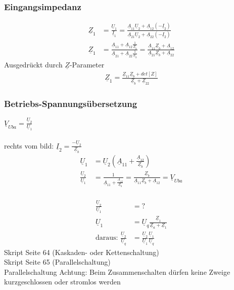 \subsubsection{Eingangsimpedanz}
\begin{align}
	\underline{Z}_1&=\frac{\underline{U}_1}{\underline{I}_1}=\frac{\underline{A}_{11}\underline{U}_{2}+\underline{A}_{12}\left(-\underline{I}_2\right)}{\underline{A}_{21}\underline{U}_2+\underline{A}_{22}\left(-\underline{I}_2\right)}\nonumber\\
	\underline{Z}_1&=\frac{\underline{A}_{11}+\underline{A}_{12}\frac{1}{\underline{Z}_b}}{\underline{A}_{21}+\underline{A}_{22}\frac{1}{\underline{Z}_b}}=\frac{\underline{A}_{11}\underline{Z}_b+\underline{A}_{12}}{\underline{A}_{21}\underline{Z}_b+\underline{A}_{22}}\nonumber
\end{align}
Ausgedrückt durch $\underline{Z}$-Parameter
\begin{align}
	\underline{Z}_1=\frac{\underline{Z}_{11}\underline{Z}_b+det[Z]}{\underline{Z}_b+\underline{Z}_{22}}\nonumber
\end{align}
\subsubsection{Betriebs-Spannungsübersetzung}
$\underline{V}_{Uba}=\frac{\underline{U}_{2}}{\underline{U}_{1}}$\\
\\
rechts vom bild:
$\underline{I}_{2}=\frac{-\underline{U}_{2}}{\underline{Z}_{b}}$\\
\begin{align}
	\underline{U}_{1}&=\underline{U}_{2}\left(\underline{A}_{11}+\frac{\underline{A}_{12}}{\underline{Z}_{b}}\right)\nonumber\\
	\frac{\underline{U}_{2}}{\underline{U}_{1}}&=\frac{1}{\underline{A}_{11}+\frac{\underline{A}_{12}}{\underline{Z}_{b}}}=\frac{\underline{Z}_{b}}{\underline{A}_{11}\underline{Z}_{b}+\underline{A}_{12}}=\underline{V}_{Uba}\nonumber
\end{align}
\\
\begin{align}
 	\frac{\underline{U}_{2}}{\underline{U}_{1}}&=?\nonumber\\
	\underline{U}_{1}&=\underline{U}_{q}\frac{\underline{Z}_{1}}{\underline{Z}_{a}+\underline{Z}_{1}}\nonumber\\
	\text{daraus: }
	\frac{\underline{U}_{2}}{\underline{U}_{q}}&=\frac{\underline{U}_{2}}{\underline{U}_{1}}\frac{\underline{U}_{1}}{\underline{U}_{q}}\nonumber
\end{align}
Skript Seite 64 (Kaskaden- oder Kettenschaltung)\\
Skript Seite 65 (Parallelschaltung)\\
Parallelschaltung Achtung: Beim Zusammenschalten dürfen keine Zweige
kurzgeschlossen oder stromlos werden\\
